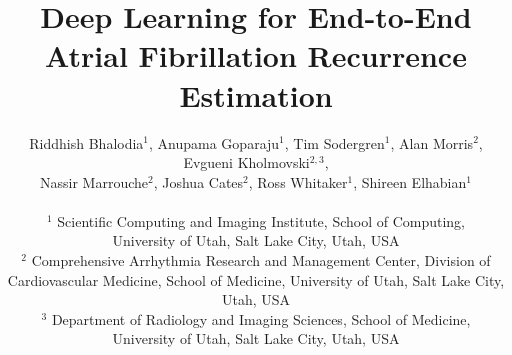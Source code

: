 \documentclass[twocolumn]{cinc}
\begin{document}


\title{Deep Learning for End-to-End Atrial Fibrillation Recurrence Estimation}


\author{ Riddhish Bhalodia$^1$, Anupama Goparaju$^1$, Tim Sodergren$^1$, Alan Morris$^2$, Evgueni Kholmovski$^{2,3}$,\\
	Nassir Marrouche$^2$, Joshua Cates$^2$, Ross Whitaker$^1$, Shireen Elhabian$^1$ \\
\ \\ %
$^1$ Scientific Computing and Imaging Institute, School of Computing, \\ 
University of Utah, Salt Lake City, Utah, USA
 \\
$^2$ Comprehensive Arrhythmia Research and Management Center, Division of
 Cardiovascular Medicine, School of Medicine, University of Utah, Salt Lake City, Utah, USA
\\
$^3$ Department of Radiology and Imaging Sciences, School of Medicine, \\ University of Utah, Salt Lake City, Utah, USA
 } %
\maketitle
\end{document}
